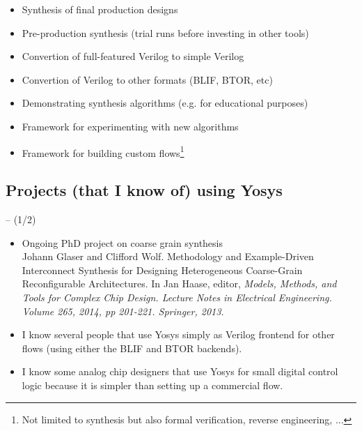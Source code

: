\begin{frame}{\subsecname}
\begin{itemize}
\item Synthesis of final production designs
\item Pre-production synthesis (trial runs before investing in other tools)
\item Convertion of full-featured Verilog to simple Verilog
\item Convertion of Verilog to other formats (BLIF, BTOR, etc)
\item Demonstrating synthesis algorithms (e.g. for educational purposes)
\item Framework for experimenting with new algorithms
\item Framework for building custom flows\footnote[frame]{Not limited to synthesis
but also formal verification, reverse engineering, ...}
\end{itemize}
\end{frame}


\subsection{Projects (that I know of) using Yosys}

\begin{frame}{\subsecname{} -- (1/2)}
\begin{itemize}
\item Ongoing PhD project on coarse grain synthesis \\
{\setlength{\parindent}{0.5cm}\footnotesize
Johann Glaser and Clifford Wolf. Methodology and Example-Driven Interconnect
Synthesis for Designing Heterogeneous Coarse-Grain Reconfigurable
Architectures. In Jan Haase, editor, \it Models, Methods, and Tools for Complex
Chip Design. Lecture Notes in Electrical Engineering. Volume 265, 2014, pp
201-221. Springer, 2013.}

\bigskip
\item I know several people that use Yosys simply as Verilog frontend for other
flows (using either the BLIF and BTOR backends).

\bigskip
\item I know some analog chip designers that use Yosys for small digital
control logic because it is simpler than setting up a commercial flow.
\end{itemize}
\end{frame}

